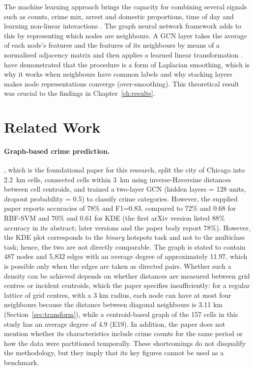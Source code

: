 \documentclass[11pt,a4paper]{report}
\begin{document}
The machine learning approach brings the capacity for combining several signals such as counts, crime mix, arrest and domestic proportions, time of day and learning non-linear interactions \citep{zhang2020}. The graph neural network framework adds to this by representing which nodes are neighbours. A GCN layer takes the average of each node's features and the features of its neighbours by means of a normalised adjacency matrix and then applies a learned linear transformation \citep{kipf2017}. \citet{li2018} have demonstrated that the procedure is a form of Laplacian smoothing, which is why it works when neighbours have common labels and why stacking layers makes node representations converge (over-smoothing). This theoretical result was crucial to the findings in Chapter~\ref{ch:results}.

\section{Related Work}
\paragraph{Graph-based crime prediction.} \citet{zubair2025}, which is the foundational paper for this research, split the city of Chicago into 2.2~km cells, connected cells within 3~km using inverse-Haversine distances between cell centroids, and trained a two-layer GCN (hidden layers = 128 units, dropout probability = 0.5) to classify crime categories. However, the supplied paper reports accuracies of 78\% and F1=0.83, compared to 72\% and 0.68 for RBF-SVM and 70\% and 0.61 for KDE (the first arXiv version listed 88\% accuracy in its abstract; later versions and the paper body report 78\%). However, the KDE plot corresponds to the  \emph{binary}  hotspots task and not to the multiclass task; hence, the two are not directly comparable. The graph is stated to contain 487 nodes and 5,832 edges with an average degree of approximately 11.97, which is possible only when the edges are taken as directed pairs. Whether such a density can be achieved depends on whether distances are measured between grid centres or incident centroids, which the paper specifies insufficiently: for a regular lattice of grid centres, with a 3 km radius, each node can have at most four neighbours because the distance between diagonal neighbours is 3.11 km (Section~\ref{sec:transform}), while a centroid-based graph of the 157 cells in this study has an average degree of 4.9 (E19). In addition, the paper does not mention whether its characteristics include crime counts for the same period or how the data were partitioned temporally. These shortcomings do not disqualify the methodology, but they imply that its key figures cannot be used as a benchmark.
\end{document}
